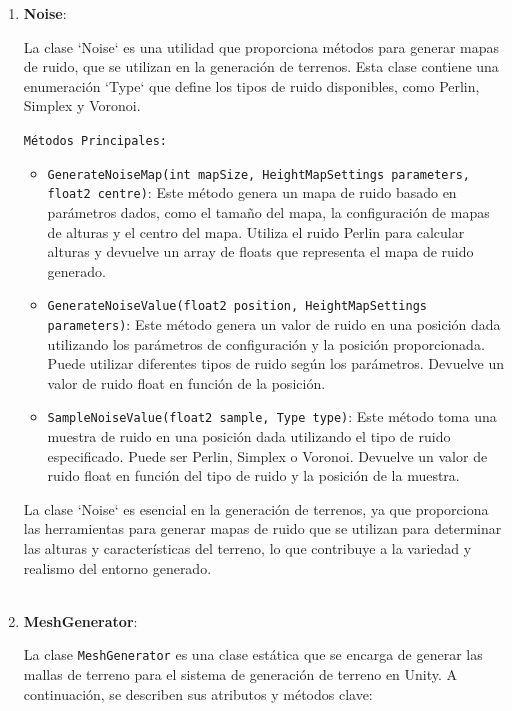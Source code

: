 \begin{enumerate}
    \item \textbf{Noise}:

    La clase `Noise` es una utilidad que proporciona métodos para generar mapas de ruido, que se utilizan en la generación de terrenos. Esta clase contiene una enumeración `Type` que define los tipos de ruido disponibles, como Perlin, Simplex y Voronoi.

    \texttt{Métodos Principales:}

    \begin{itemize}
        \item \texttt{GenerateNoiseMap(int mapSize, HeightMapSettings parameters, float2 centre)}: Este método genera un mapa de ruido basado en parámetros dados, como el tamaño del mapa, la configuración de mapas de alturas y el centro del mapa. Utiliza el ruido Perlin para calcular alturas y devuelve un array de floats que representa el mapa de ruido generado.

        \item \texttt{GenerateNoiseValue(float2 position, HeightMapSettings parameters)}: Este método genera un valor de ruido en una posición dada utilizando los parámetros de configuración y la posición proporcionada. Puede utilizar diferentes tipos de ruido según los parámetros. Devuelve un valor de ruido float en función de la posición.

        \item \texttt{SampleNoiseValue(float2 sample, Type type)}: Este método toma una muestra de ruido en una posición dada utilizando el tipo de ruido especificado. Puede ser Perlin, Simplex o Voronoi. Devuelve un valor de ruido float en función del tipo de ruido y la posición de la muestra.

    \end{itemize}

    La clase `Noise` es esencial en la generación de terrenos, ya que proporciona las herramientas para generar mapas de ruido que se utilizan para determinar las alturas y características del terreno, lo que contribuye a la variedad y realismo del entorno generado.\\
    \\

    \item \textbf{MeshGenerator}:

    La clase \texttt{MeshGenerator} es una clase estática que se encarga de generar las mallas de terreno para el sistema de generación de terreno en Unity. A continuación, se describen sus atributos y métodos clave:


\end{enumerate}

